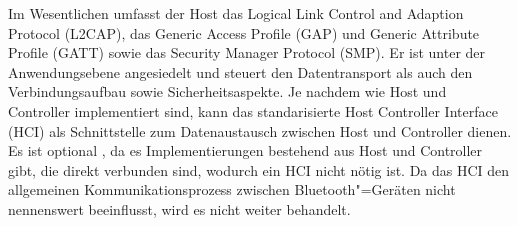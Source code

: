 Im Wesentlichen umfasst der Host das Logical Link Control and Adaption Protocol (L2CAP), das Generic Access Profile (GAP) und Generic Attribute Profile (GATT) sowie das Security Manager Protocol (SMP). Er ist unter der Anwendungsebene angesiedelt und steuert den Datentransport als auch den Verbindungsaufbau sowie Sicherheitsaspekte. Je nachdem wie Host und Controller implementiert sind, kann das standarisierte Host Controller Interface (HCI) als Schnittstelle zum Datenaustausch zwischen Host und Controller dienen. Es ist optional \cite{BtSpec4.0_138}, da es Implementierungen bestehend aus Host und Controller gibt, die direkt verbunden sind, wodurch ein HCI nicht nötig ist. Da das HCI den allgemeinen Kommunikationsprozess zwischen Bluetooth"=Geräten nicht nennenswert beeinflusst, wird es nicht weiter behandelt.